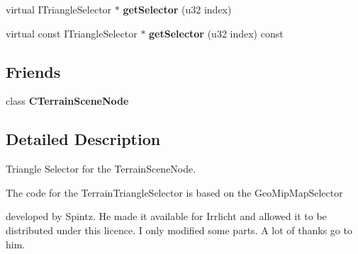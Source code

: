 \begin{DoxyCompactItemize}
\item 
\hypertarget{classirr_1_1scene_1_1_c_terrain_triangle_selector_a8ff0505e1b96e4a849e096374e753192}{virtual I\-Triangle\-Selector $\ast$ {\bfseries get\-Selector} (u32 index)}\label{classirr_1_1scene_1_1_c_terrain_triangle_selector_a8ff0505e1b96e4a849e096374e753192}

\item 
\hypertarget{classirr_1_1scene_1_1_c_terrain_triangle_selector_a496f32287611417c57ab126363822df5}{virtual const I\-Triangle\-Selector $\ast$ {\bfseries get\-Selector} (u32 index) const }\label{classirr_1_1scene_1_1_c_terrain_triangle_selector_a496f32287611417c57ab126363822df5}

\end{DoxyCompactItemize}
\subsection*{Friends}
\begin{DoxyCompactItemize}
\item 
\hypertarget{classirr_1_1scene_1_1_c_terrain_triangle_selector_a6f9b01ca9d62f599f60e12e2ac3ea5a7}{class {\bfseries C\-Terrain\-Scene\-Node}}\label{classirr_1_1scene_1_1_c_terrain_triangle_selector_a6f9b01ca9d62f599f60e12e2ac3ea5a7}

\end{DoxyCompactItemize}


\subsection{Detailed Description}
Triangle Selector for the Terrain\-Scene\-Node. 

\begin{DoxyVerb}The code for the TerrainTriangleSelector is based on the GeoMipMapSelector
\end{DoxyVerb}
 developed by Spintz. He made it available for Irrlicht and allowed it to be distributed under this licence. I only modified some parts. A lot of thanks go to him. 

